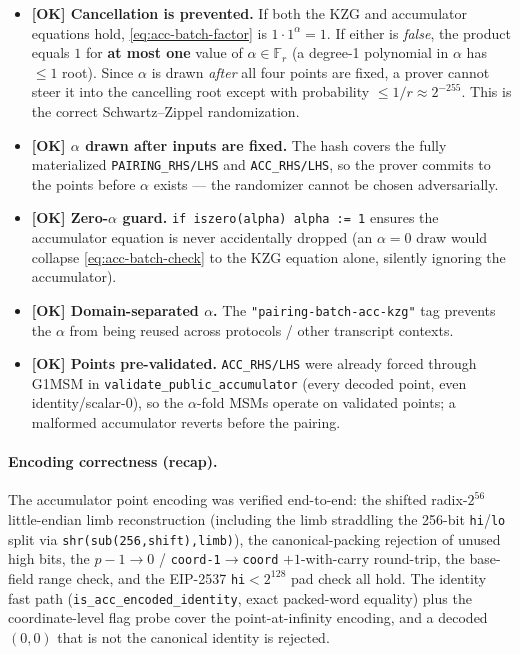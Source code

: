 \begin{itemize}
  \item \textcolor{tracegreen}{\textbf{[OK] Cancellation is prevented.}}
        If both the KZG and accumulator equations hold,
        \eqref{eq:acc-batch-factor} is $1\cdot 1^{\alpha}=1$. If either
        is \emph{false}, the product equals $1$ for \textbf{at most one}
        value of $\alpha\in\mathbb{F}_r$ (a degree-1 polynomial in
        $\alpha$ has $\le 1$ root). Since $\alpha$ is drawn
        \emph{after} all four points are fixed, a prover cannot steer it
        into the cancelling root except with probability $\le 1/r
        \approx 2^{-255}$. This is the correct Schwartz--Zippel
        randomization.
  \item \textcolor{tracegreen}{\textbf{[OK] $\alpha$ drawn after inputs
        are fixed.}} The hash covers the fully materialized
        \texttt{PAIRING\_RHS/LHS} and \texttt{ACC\_RHS/LHS}, so the
        prover commits to the points before $\alpha$ exists --- the
        randomizer cannot be chosen adversarially.
  \item \textcolor{tracegreen}{\textbf{[OK] Zero-$\alpha$ guard.}}
        \texttt{if iszero(alpha) alpha := 1} ensures the accumulator
        equation is never accidentally dropped (an $\alpha=0$ draw would
        collapse \eqref{eq:acc-batch-check} to the KZG equation alone,
        silently ignoring the accumulator).
  \item \textcolor{tracegreen}{\textbf{[OK] Domain-separated $\alpha$.}}
        The \texttt{"pairing-batch-acc-kzg"} tag prevents the $\alpha$
        from being reused across protocols / other transcript contexts.
  \item \textcolor{tracegreen}{\textbf{[OK] Points pre-validated.}}
        \texttt{ACC\_RHS/LHS} were already forced through G1MSM in
        \texttt{validate\_\allowbreak{}public\_\allowbreak{}accumulator} (every decoded point,
        even identity/scalar-0), so the $\alpha$-fold MSMs operate on
        validated points; a malformed accumulator reverts before the
        pairing.
\end{itemize}

\paragraph{Encoding correctness (recap).} The accumulator point
encoding was verified end-to-end: the shifted radix-$2^{56}$ little-endian
limb reconstruction (including the limb straddling the 256-bit
\texttt{hi}/\texttt{lo} split via \texttt{shr(sub(256,shift),limb)}),
the canonical-packing rejection of unused high bits, the
$p-1\!\to\!0$ / \texttt{coord-1}$\to$\texttt{coord} $+1$-with-carry
round-trip, the base-field range check, and the EIP-2537
\texttt{hi}$<2^{128}$ pad check all hold. The identity fast path
(\texttt{is\_\allowbreak{}acc\_\allowbreak{}encoded\_\allowbreak{}identity}, exact packed-word equality) plus
the coordinate-level flag probe cover the point-at-infinity encoding,
and a decoded $(0,0)$ that is not the canonical identity is rejected.

